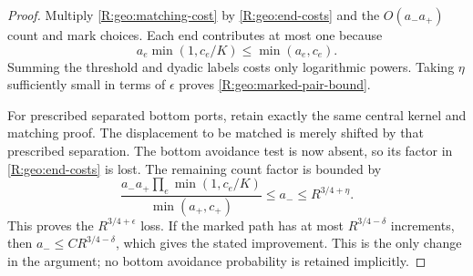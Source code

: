 \begin{proof}
Multiply \eqref{R:geo:matching-cost} by \eqref{R:geo:end-costs}
and the $O(a_-a_+)$ count and mark choices.  Each end contributes at
most one because
\[
       a_e\min(1,c_e/K)\le\min(a_e,c_e).
\]
Summing the threshold and dyadic labels costs only logarithmic powers.
Taking $\eta$ sufficiently small in terms of $\epsilon$ proves
\eqref{R:geo:marked-pair-bound}.

For prescribed separated bottom ports, retain exactly the same central
kernel and matching proof.  The displacement to be matched is merely
shifted by that prescribed separation.  The bottom avoidance test is
now absent, so its factor in \eqref{R:geo:end-costs} is lost.  The
remaining count factor is bounded by
\[
 \frac{a_-a_+\prod_e\min(1,c_e/K)}{\min(a_+,c_+)}
       \le a_-\le R^{3/4+\eta}.
\]
This proves the $R^{3/4+\epsilon}$ loss.  If the marked path has at
most $R^{3/4-\delta}$ increments, then $a_-\le C R^{3/4-\delta}$,
which gives the stated improvement.  This is the only change in the
argument; no bottom avoidance probability is retained implicitly.
\end{proof}

